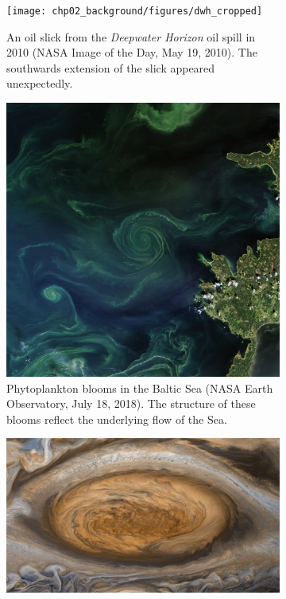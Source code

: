 \begin{figure}
	\centering
		\begin{subfigure}[t]{0.49\textwidth}
			\texttt{[image: chp02\_background/figures/dwh\_cropped]}
			\caption{An oil slick from the \emph{Deepwater Horizon} oil spill in 2010 (NASA Image of the Day, May 19, 2010).
				The southwards extension of the slick appeared unexpectedly.}
			\label{fig:lcs_deepwater}
		\end{subfigure}
		\begin{subfigure}[t]{0.49\textwidth}
			\includegraphics[width=\textwidth]{chp02_background/figures/photoplankton}
			\caption{Phytoplankton blooms in the Baltic Sea (NASA Earth Observatory, July 18, 2018).
				The structure of these blooms reflect the underlying flow of the Sea.}
			\label{fig:lcs_phyto}
		\end{subfigure}
		\begin{subfigure}[t]{\textwidth}
			\includegraphics[width=\textwidth]{chp02_background/figures/red_spot.png}

\end{subfigure}
\end{figure}
